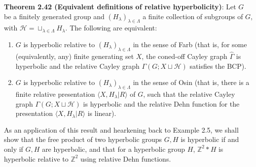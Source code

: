 \documentclass[12pt]{article}
\newcommand{\vs}{\vskip10pt}
\begin{document}
	\vs 
	
	\textbf{Theorem 2.42 (Equivalent definitions of relative hyperbolicity)}: Let $G$ be a finitely generated group and $(H_{\lambda})_{\lambda \in \Lambda}$ a finite collection of subgroups of $G$, with $\mathcal{H} = \sqcup_{\lambda \in \Lambda} H_{\lambda}$. The following are equivalent: 
	
	\begin{enumerate} [label = (\alph*)]
		\item $G$ is hyperbolic relative to $(H_{\lambda})_{\lambda \in \Lambda}$ in the sense of Farb (that is, for some (equivalently, any) finite generating set $X$, the coned-off Cayley graph $\hat{\Gamma}$ is hyperbolic and the relative Cayley graph $\Gamma(G; X \sqcup \mathcal{H})$ satisfies the BCP). 
		\item $G$ is hyperbolic relative to $(H_{\lambda})_{\lambda \in \Lambda}$ in the sense of Osin (that is, there is a finite relative presentation $\langle X, H_{\lambda} \vert R \rangle$ of $G$, such that the relative Cayley graph $\Gamma(G; X \sqcup \mathcal{H})$ is hyperbolic and the relative Dehn function for the presentation $\langle X, H_{\lambda} \vert R \rangle$ is linear).
	\end{enumerate}
	
	\vs
	
	As an application of this result and hearkening back to Example 2.5, we shall show that the free product of two hyperbolic groups $G,H$ is hyperbolic if and only if $G,H$ are hyperbolic, and that for a hyperbolic group $H$, $\mathbb{Z}^2 * H$ is hyperbolic relative to $\mathbb{Z}^2$ using relative Dehn functions. 
	
	\vs 
	
\end{document}
